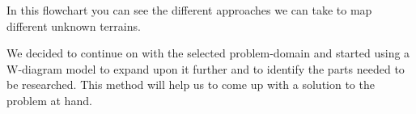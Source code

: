 In this flowchart you can see the different approaches we can take to map different unknown terrains.

We decided to continue on with the selected problem-domain and started using a W-diagram model to expand upon it further and to identify the parts needed to be researched. This method will help us to come up with a solution to the problem at hand.
